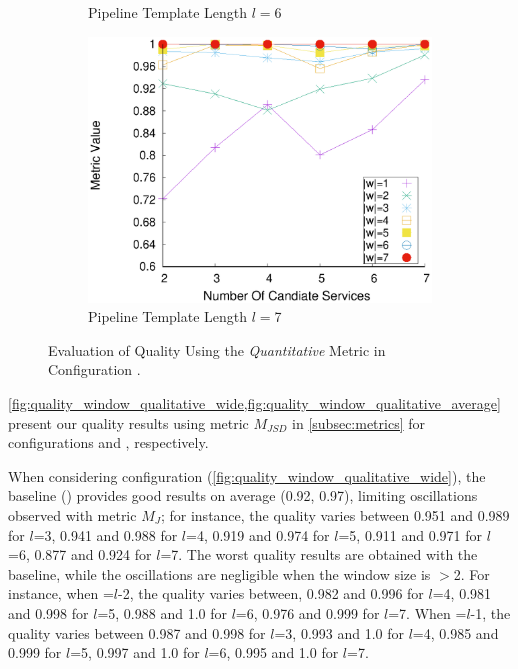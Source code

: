 \begin{figure}[ht!]
\begin{subfigure}{0.49\textwidth}
        \caption{Pipeline Template Length $l$$=$6}
        \label{fig:quality_window_average_perce_n6}
      \end{subfigure}
      \hfill
      \begin{subfigure}{0.49\textwidth}
        \includegraphics[width=\textwidth]{Images/graphs/window_quality_performance_diff_perce_n7_s7_50_89_n7}
        \caption{Pipeline Template Length $l$$=$7}
        \label{fig:quality_window_average_perce_n7}
      \end{subfigure}


      \caption{Evaluation of Quality Using the \emph{Quantitative} Metric in Configuration \average.}  \label{fig:quality_window_perce_average}

    \end{figure}

    \cref{fig:quality_window_qualitative_wide,fig:quality_window_qualitative_average} {\color{OurColor2}present} our quality results using metric $M_{JSD}$ in \cref{subsec:metrics} for configurations \wide and \average, respectively.


    When considering configuration \wide (\cref{fig:quality_window_qualitative_wide}), the baseline () provides good results on average (0.92, 0.97), limiting oscillations observed with metric $M_J$; for instance, the quality varies between 0.951 and 0.989 for $l$=3, 0.941 and 0.988 for $l$=4, 0.919 and 0.974 for $l$=5, 0.911 and 0.971 for $l$=6, 0.877 and 0.924 for $l$=7.
    The worst quality results are obtained with the baseline, while the oscillations are negligible when the window size is $>$2. For instance, when \windowsize=$l$-2, the quality varies between, 0.982 and 0.996 for $l$=4, 0.981 and 0.998 for $l$=5, 0.988 and 1.0 for $l$=6, 0.976 and 0.999 for $l$=7. When \windowsize=$l$-1, the quality varies between  0.987 and  0.998 for $l$=3, 0.993 and 1.0 for $l$=4, 0.985 and 0.999 for $l$=5, 0.997 and 1.0 for $l$=6, 0.995 and 1.0  for $l$=7.

